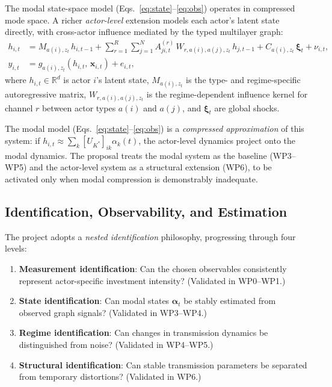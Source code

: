 \documentclass[11pt,a4paper]{article}
\theoremstyle{definition}
\newcommand{\R}{\mathbb{R}}
\newcommand{\bx}{\bm{x}}
\newcommand{\balpha}{\bm{\alpha}}
\begin{document}
The modal state-space model (Eqs.~\ref{eq:state}--\ref{eq:obs}) operates in compressed mode space. A richer \emph{actor-level} extension models each actor's latent state directly, with cross-actor influence mediated by the typed multilayer graph:
\begin{align}
  h_{i,t} &= M_{a(i),z_t}\, h_{i,t-1} + \sum_{r=1}^{R}\sum_{j=1}^{N} A^{(r)}_{ji,t}\, W_{r,a(i),a(j),z_t}\, h_{j,t-1} + C_{a(i),z_t}\,\bm{\xi}_t + \nu_{i,t},
  \label{eq:actor_state}\\[4pt]
  y_{i,t} &= g_{a(i),z_t}(h_{i,t},\, \bx_{i,t}) + e_{i,t},
  \label{eq:actor_obs}
\end{align}
where $h_{i,t} \in \R^d$ is actor $i$'s latent state, $M_{a(i),z_t}$ is the type- and regime-specific autoregressive matrix, $W_{r,a(i),a(j),z_t}$ is the regime-dependent influence kernel for channel $r$ between actor types $a(i)$ and $a(j)$, and $\bm{\xi}_t$ are global shocks.

The modal model (Eqs.~\ref{eq:state}--\ref{eq:obs}) is a \emph{compressed approximation} of this system: if $h_{i,t} \approx \sum_k [U_{K^*}]_{ik}\alpha_k(t)$, the actor-level dynamics project onto the modal dynamics. The proposal treats the modal system as the baseline (WP3--WP5) and the actor-level system as a structural extension (WP6), to be activated only when modal compression is demonstrably inadequate.

\subsection{Identification, Observability, and Estimation}
\label{sec:identification}

The project adopts a \emph{nested identification} philosophy, progressing through four levels:

\begin{enumerate}[nosep]
  \item \textbf{Measurement identification}: Can the chosen observables consistently represent actor-specific investment intensity? (Validated in WP0--WP1.)
  \item \textbf{State identification}: Can modal states $\balpha_t$ be stably estimated from observed graph signals? (Validated in WP3--WP4.)
  \item \textbf{Regime identification}: Can changes in transmission dynamics be distinguished from noise? (Validated in WP4--WP5.)
  \item \textbf{Structural identification}: Can stable transmission parameters be separated from temporary distortions? (Validated in WP6.)
\end{enumerate}
\end{document}
